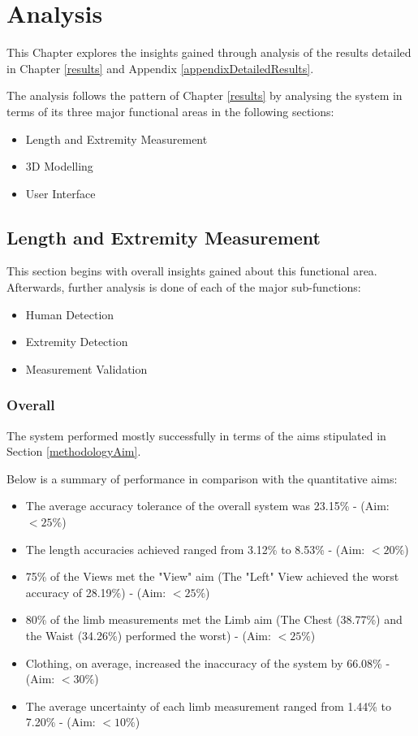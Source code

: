 \chapter{Analysis} \label{analysis}

This Chapter explores the insights gained through analysis of the results detailed in Chapter \ref{results} and Appendix \ref{appendixDetailedResults}.

The analysis follows the pattern of Chapter \ref{results} by analysing the system in terms of its three major functional areas in the following sections:

\begin{itemize}
	\item Length and Extremity Measurement
	\item 3D Modelling
	\item User Interface
\end{itemize} 

\section{Length and Extremity Measurement}
This section begins with overall insights gained about this functional area. Afterwards, further analysis is done of each of the major sub-functions:

\begin{itemize}
	\item Human Detection
	\item Extremity Detection
	\item Measurement Validation
\end{itemize}

\subsection{Overall}
The system performed mostly successfully in terms of the aims stipulated in Section \ref{methodologyAim}. 

Below is a summary of performance in comparison with the quantitative aims:

\begin{itemize}
	\item The average accuracy tolerance of the overall system was 23.15\% - (Aim: $<25\%$)
	\item The length accuracies achieved ranged from 3.12\% to 8.53\% - (Aim: $<20\%$)
	\item 75\% of the Views met the "View" aim (The "Left" View achieved the worst accuracy of 28.19\%) - (Aim: $<25\%$)
	\item 80\% of the limb measurements met the Limb aim (The Chest (38.77\%) and the Waist (34.26\%) performed the worst) - (Aim: $<25\%$)
	\item Clothing, on average, increased the inaccuracy of the system by 66.08\% - (Aim: $<30\%$)
	\item The average uncertainty of each limb measurement ranged from 1.44\% to 7.20\% - (Aim: $<10\%$)
\end{itemize}

